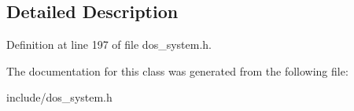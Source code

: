 \subsection{Detailed Description}


Definition at line 197 of file dos\-\_\-system.\-h.



The documentation for this class was generated from the following file\-:\begin{DoxyCompactItemize}
\item 
include/dos\-\_\-system.\-h\end{DoxyCompactItemize}
